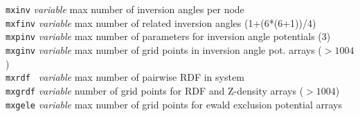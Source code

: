 \begin{tabbing}
\> {\tt mxinv}       \> {\em variable}       \> max number of inversion angles per node \\
\> {\tt mxfinv}      \> {\em variable}       \> max number of related inversion angles (1+(6*(6+1))/4) \\
\> {\tt mxpinv}      \> {\em variable}       \> max number of parameters for inversion angle potentials (3) \\
\> {\tt mxginv}      \> {\em variable}       \> max number of grid points in inversion angle pot. arrays ($> 1004$) \\
\> {\tt mxrdf }      \> {\em variable}       \> max number of pairwise RDF in system \\
\> {\tt mxgrdf}      \> {\em variable}       \> number of grid points for RDF and Z-density arrays ($> 1004$)\\
\> {\tt mxgele}      \> {\em variable}       \> max number of grid points for ewald exclusion potential arrays \\


\end{tabbing}
